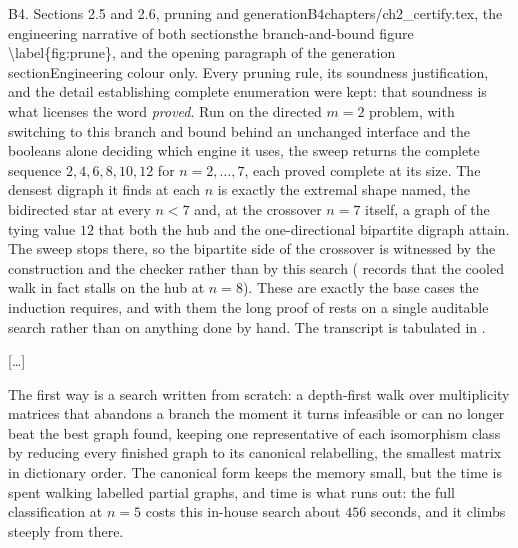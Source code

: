 \begin{offcutrewrite}{B4. Sections 2.5 and 2.6, pruning and generation}{B4}{chapters/ch2\_certify.tex, the engineering narrative of both sections}{the branch-and-bound figure \textbackslash{}label\{fig:prune\}, and the opening paragraph of the generation section}{Engineering colour only. Every pruning rule, its soundness justification, and the detail establishing complete enumeration were kept: that soundness is what licenses the word \emph{proved}.}
Run on the directed $m = 2$ problem, with  switching to this branch and bound behind an unchanged interface and the booleans alone deciding which engine it uses, the sweep returns the complete sequence $2, 4, 6, 8, 10, 12$ for $n = 2, \dots, 7$, each proved complete at its size. The densest digraph it finds at each $n$ is exactly the extremal shape  named, the bidirected star at every $n < 7$ and, at the crossover $n = 7$ itself, a graph of the tying value $12$ that both the hub and the one-directional bipartite digraph attain. The sweep stops there, so the bipartite side of the crossover is witnessed by the construction and the checker rather than by this search ( records that the cooled walk in fact stalls on the hub at $n = 8$). These are exactly the base cases the induction requires, and with them the long proof of  rests on a single auditable search rather than on anything done by hand. The transcript is tabulated in .

[\dots]

The first way is a search written from scratch: a depth-first walk over multiplicity matrices that abandons a branch the moment it turns infeasible or can no longer beat the best graph found, keeping one representative of each isomorphism class by reducing every finished graph to its canonical relabelling, the smallest matrix in dictionary order. The canonical form keeps the memory small, but the time is spent walking labelled partial graphs, and time is what runs out: the full classification at $n = 5$ costs this in-house search about $456$ seconds, and it climbs steeply from there.


\end{offcutrewrite}
